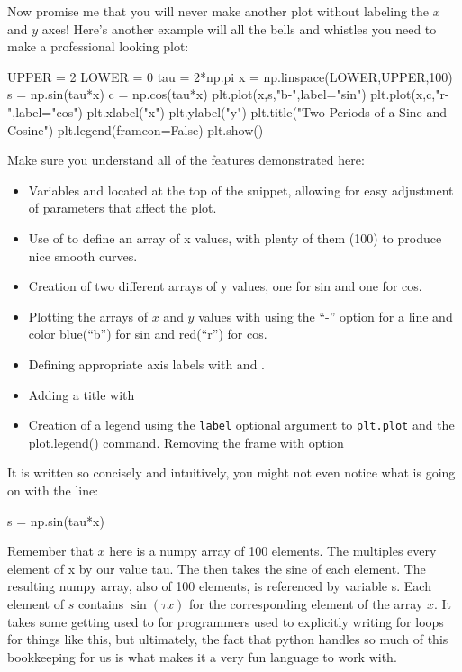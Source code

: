 Now promise me that you will never make another plot without labeling
the $x$ and $y$ axes! Here's another example will all the bells and
whistles you need to make a professional looking plot:
\begin{python}
UPPER = 2
LOWER = 0
tau   = 2*np.pi
x = np.linspace(LOWER,UPPER,100)
s = np.sin(tau*x)
c = np.cos(tau*x)
plt.plot(x,s,"b-",label="sin")
plt.plot(x,c,"r-",label="cos")
plt.xlabel("x")
plt.ylabel("y")
plt.title("Two Periods of a Sine and Cosine")
plt.legend(frameon=False)
plt.show()
\end{python}
Make sure you understand all of the features demonstrated here:
\begin{itemize}
 \item Variables  and  located at the top of
   the snippet, allowing for easy adjustment of parameters that affect
   the plot.
 \item Use of  to define an array of x values, with
   plenty of them (100) to produce nice smooth curves.
 \item Creation of two different arrays of y values, one for sin and one for cos.
 \item Plotting the arrays of $x$ and $y$ values with  using the ``-'' option for a line and color blue(``b'') for sin and red(``r'') for cos. 
 \item Defining appropriate axis labels with  and . 
 \item Adding a title with 
 \item Creation of a legend using the {\tt label} optional argument to {\tt plt.plot} and the {plot.legend()} command.  Removing the frame with option 
\end{itemize}
It is written so concisely and intuitively, you might not even notice
what is going on with the line:
\begin{python}
s = np.sin(tau*x)  
\end{python}

Remember that $x$ here is a numpy array of 100 elements.  The
 multiples every element of x by our value tau.  The
 then takes the sine of each element.  The
resulting numpy array, also of 100 elements, is referenced by variable
s.  Each element of $s$ contains $\sin(\tau x)$ for the corresponding
element of the array $x$.  It takes some getting used to for
programmers used to explicitly writing for loops for things like this,
but ultimately, the fact that python handles so much of this
bookkeeping for us is what makes it a very fun language to work with.

